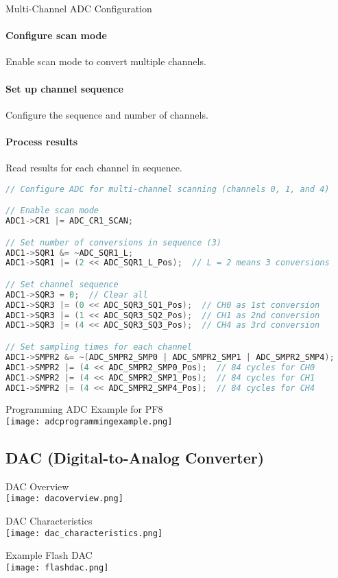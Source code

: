 \begin{KR}{Multi-Channel ADC Configuration}
\paragraph{Configure scan mode}
Enable scan mode to convert multiple channels.
\paragraph{Set up channel sequence}
Configure the sequence and number of channels.
\paragraph{Process results}
Read results for each channel in sequence.

\begin{lstlisting}[language=C, style=basesmol]
// Configure ADC for multi-channel scanning (channels 0, 1, and 4)

// Enable scan mode
ADC1->CR1 |= ADC_CR1_SCAN;

// Set number of conversions in sequence (3)
ADC1->SQR1 &= ~ADC_SQR1_L;
ADC1->SQR1 |= (2 << ADC_SQR1_L_Pos);  // L = 2 means 3 conversions

// Set channel sequence
ADC1->SQR3 = 0;  // Clear all
ADC1->SQR3 |= (0 << ADC_SQR3_SQ1_Pos);  // CH0 as 1st conversion
ADC1->SQR3 |= (1 << ADC_SQR3_SQ2_Pos);  // CH1 as 2nd conversion
ADC1->SQR3 |= (4 << ADC_SQR3_SQ3_Pos);  // CH4 as 3rd conversion

// Set sampling times for each channel
ADC1->SMPR2 &= ~(ADC_SMPR2_SMP0 | ADC_SMPR2_SMP1 | ADC_SMPR2_SMP4);
ADC1->SMPR2 |= (4 << ADC_SMPR2_SMP0_Pos);  // 84 cycles for CH0
ADC1->SMPR2 |= (4 << ADC_SMPR2_SMP1_Pos);  // 84 cycles for CH1
ADC1->SMPR2 |= (4 << ADC_SMPR2_SMP4_Pos);  // 84 cycles for CH4
\end{lstlisting}
\end{KR}

\begin{example2}{Programming ADC} Example for PF8\\
    \texttt{[image: adcprogrammingexample.png]}
\end{example2}



\raggedcolumns
\columnbreak

\subsection{DAC (Digital-to-Analog Converter)}
\begin{definition}{DAC Overview}\\
    \texttt{[image: dacoverview.png]}
\end{definition}

\begin{concept}{DAC Characteristics}\\
    \texttt{[image: dac\_characteristics.png]}
\end{concept}

\begin{theorem}{Example Flash DAC}\\
    \texttt{[image: flashdac.png]}
\end{theorem}


